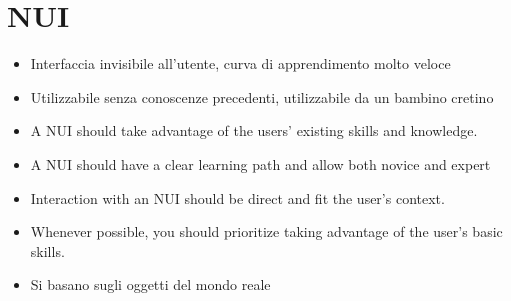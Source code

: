 \chapter{NUI}

\begin{itemize}
    \item {} Interfaccia invisibile all'utente, curva di apprendimento molto veloce
    \item Utilizzabile senza conoscenze precedenti, utilizzabile da un bambino cretino
    \item A NUI should take advantage of the users’ existing skills and knowledge.
    \item A NUI should have a clear learning path and allow both novice and expert
    \item Interaction with an NUI should be direct and fit the user’s context.
    \item Whenever possible, you should prioritize taking advantage of the user’s basic skills.
    \item {} Si basano sugli oggetti del mondo reale
\end{itemize}